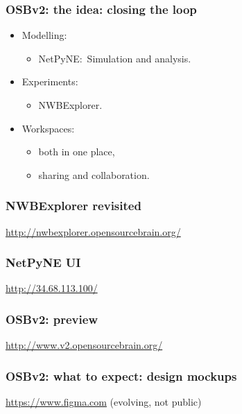 \begin{frame}[c]
  \frametitle{OSBv2: the idea: closing the loop}
    \begin{itemize}
      \item Modelling:
        \begin{itemize}
          \item NetPyNE:\ Simulation and analysis.
        \end{itemize}
      \item Experiments:
        \begin{itemize}
          \item NWBExplorer.
        \end{itemize}
        \pause{}
      \item Workspaces:
        \begin{itemize}
          \item both in one place,
          \item sharing and collaboration.
        \end{itemize}
    \end{itemize}
\end{frame}
\begin{frame}[c]
  \frametitle{NWBExplorer revisited}
  \url{http://nwbexplorer.opensourcebrain.org/}
\end{frame}
\begin{frame}[c]
  \frametitle{NetPyNE UI}
  \url{http://34.68.113.100/}
\end{frame}
\begin{frame}[c]
  \frametitle{OSBv2: preview}
  \url{http://www.v2.opensourcebrain.org/}
\end{frame}
\begin{frame}[c]
  \frametitle{OSBv2: what to expect: design mockups}
  \url{https://www.figma.com} (evolving, not public)
\end{frame}
